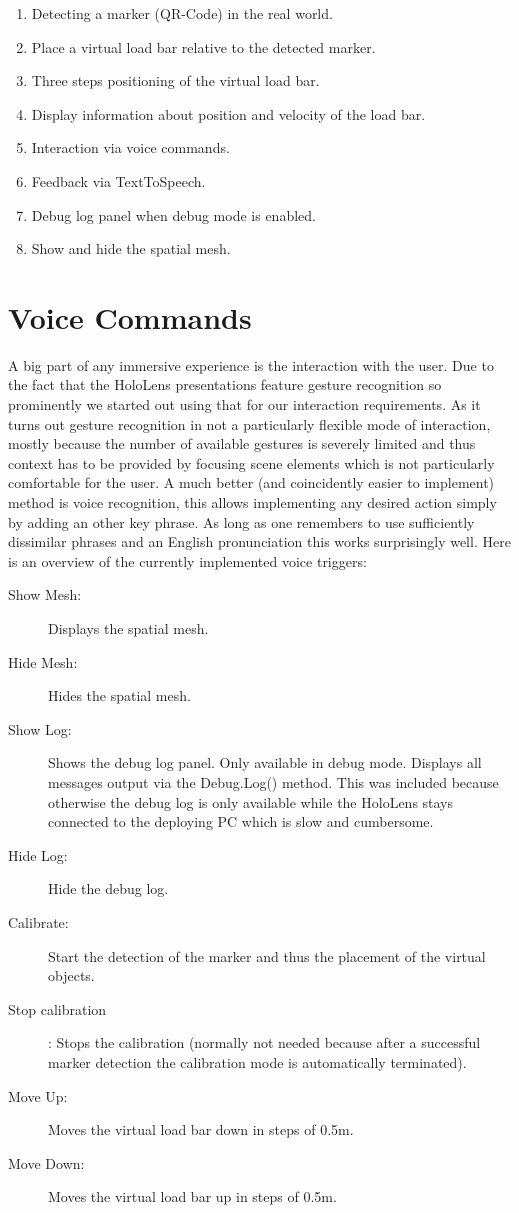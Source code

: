 \begin{enumerate}
\item Detecting a marker (QR-Code) in the real world.
\item Place a virtual load bar relative to the detected marker.
\item Three steps positioning of the virtual load bar.
\item Display information about position and velocity of the load bar.
\item Interaction via voice commands.
\item Feedback via TextToSpeech.
\item Debug log panel when debug mode is enabled.
\item Show and hide the spatial mesh.
\end{enumerate}

\section{Voice Commands}
A big part of any immersive experience is the interaction with the user. Due to the fact that the HoloLens presentations feature gesture recognition so prominently we started out using that for our interaction requirements. As it turns out gesture recognition in not a particularly flexible mode of interaction, mostly because the number of available gestures is severely limited and thus context has to be provided by focusing scene elements which is not particularly comfortable for the user.  A much better (and coincidently easier to implement) method is voice recognition, this allows implementing any desired action simply by adding an other key phrase. As long as one remembers to use sufficiently dissimilar phrases and an English pronunciation this works surprisingly well. Here is an overview of the currently implemented voice triggers:
\begin{description}
\item[Show Mesh:] Displays the spatial mesh.
\item[Hide Mesh:] Hides the spatial mesh.
\item[Show Log:] Shows the debug log panel. Only available in debug mode. Displays all messages output via the Debug.Log() method. This was included because otherwise the debug log is only available while the HoloLens stays connected to the deploying PC which is slow and cumbersome.
\item[Hide Log:] Hide the debug log.
\item[Calibrate:] Start the detection of the marker and thus the placement of the virtual objects.
\item[Stop calibration]: Stops the calibration (normally not needed because after a successful marker detection the calibration mode is automatically terminated).
\item[Move Up:] Moves the virtual load bar down in steps of 0.5m.
\item[Move Down:] Moves the virtual load bar up in steps of 0.5m.
\end{description}


